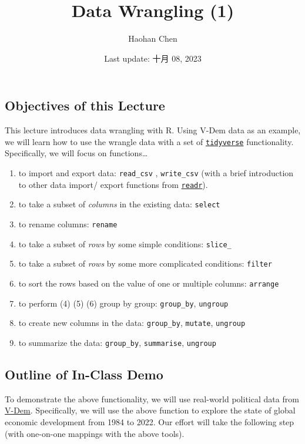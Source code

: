\documentclass[
]{article}
\title{Data Wrangling (1)}
\author{Haohan Chen}
\date{Last update: 十月 08, 2023}
\begin{document}
\maketitle

\hypertarget{objectives-of-this-lecture}{%
\subsection{Objectives of this
Lecture}\label{objectives-of-this-lecture}}

This lecture introduces data wrangling with R. Using V-Dem data as an
example, we will learn how to use the wrangle data with a set of
\href{https://www.tidyverse.org/}{\texttt{tidyverse}} functionality.
Specifically, we will focus on functions\ldots{}

\begin{enumerate}
\def\labelenumi{\arabic{enumi}.}
\item
  to import and export data: \texttt{read\_csv} , \texttt{write\_csv}
  (with a brief introduction to other data import/ export functions from
  \href{https://readr.tidyverse.org/}{\texttt{readr}}).
\item
  to take a subset of \emph{columns} in the existing data:
  \texttt{select}
\item
  to rename columns: \texttt{rename}
\item
  to take a subset of \emph{rows} by some simple conditions:
  \texttt{slice\_}
\item
  to take a subset of \emph{rows} by some more complicated conditions:
  \texttt{filter}
\item
  to sort the rows based on the value of one or multiple columns:
  \texttt{arrange}
\item
  to perform (4) (5) (6) group by group: \texttt{group\_by},
  \texttt{ungroup}
\item
  to create new columns in the data: \texttt{group\_by},
  \texttt{mutate}, \texttt{ungroup}
\item
  to summarize the data: \texttt{group\_by}, \texttt{summarise},
  \texttt{ungroup}
\end{enumerate}

\hypertarget{outline-of-in-class-demo}{%
\subsection{Outline of In-Class Demo}\label{outline-of-in-class-demo}}

To demonstrate the above functionality, we will use real-world political
data from \href{https://v-dem.net/}{V-Dem}. Specifically, we will use
the above function to explore the state of global economic development
from 1984 to 2022. Our effort will take the following step (with
one-on-one mappings with the above tools).
\end{document}
